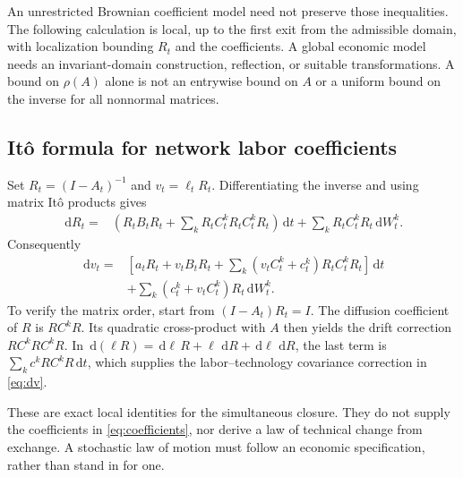 \documentclass[11pt,letterpaper]{article}
\newcommand{\dd}{\,\mathrm d}
\begin{document}
An unrestricted Brownian coefficient model need not preserve those
inequalities. The following calculation is local, up to the first exit
from the admissible domain, with localization bounding $R_t$ and the
coefficients. A global economic model needs an invariant-domain
construction, reflection, or suitable transformations. A bound on
$\rho(A)$ alone is not an entrywise bound on $A$ or a uniform bound on
the inverse for all nonnormal matrices.

\subsection{It\^o formula for network labor coefficients}
Set $R_t=(I-A_t)^{-1}$ and $v_t=\ell_tR_t$. Differentiating the inverse
and using matrix It\^o products gives
\begin{equation}\label{eq:dR}
\begin{aligned}
 \dd R_t={}&\left(R_tB_tR_t+
      \sum_kR_tC_t^kR_tC_t^kR_t\right)\dd t
      +\sum_kR_tC_t^kR_t\dd W_t^k.
\end{aligned}
\end{equation}
Consequently
\begin{equation}\label{eq:dv}
\begin{aligned}
 \dd v_t={}&\left[
     a_tR_t+v_tB_tR_t
     +\sum_k(v_tC_t^k+c_t^k)R_tC_t^kR_t
             \right]\dd t\\
 &+\sum_k(c_t^k+v_tC_t^k)R_t\dd W_t^k.
\end{aligned}
\end{equation}
To verify the matrix order, start from $(I-A_t)R_t=I$. The diffusion
coefficient of $R$ is $RC^kR$. Its quadratic cross-product with $A$
then yields the drift correction $RC^kRC^kR$. In
$\dd(\ell R)=\dd\ell\,R+\ell\,\dd R+\dd\ell\,\dd R$, the last
term is $\sum_kc^kRC^kR\dd t$, which supplies the labor--technology
covariance correction in \eqref{eq:dv}.

These are exact local identities for the simultaneous closure.
They do not supply the coefficients in \eqref{eq:coefficients}, nor
derive a law of technical change from exchange. A stochastic law of
motion must follow an economic specification, rather than stand in for
one.
\end{document}
